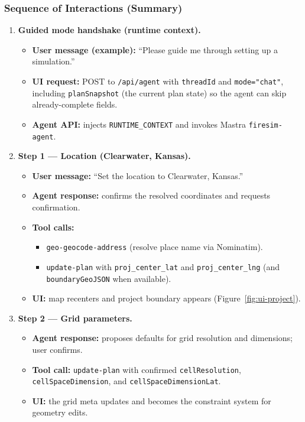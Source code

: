 \documentclass[12pt]{article}
\begin{document}
\subsubsection{Sequence of Interactions (Summary)}
\begin{enumerate}
  \item \textbf{Guided mode handshake (runtime context).}
  \begin{itemize}
    \item \textbf{User message (example):} ``Please guide me through setting up a simulation.''
    \item \textbf{UI request:} POST to \texttt{/api/agent} with \texttt{threadId} and
          \texttt{mode="chat"}, including \texttt{planSnapshot} (the current plan state) so the agent can
          skip already-complete fields.
    \item \textbf{Agent API:} injects \texttt{RUNTIME\_CONTEXT} and invokes Mastra
          \texttt{firesim-agent}.
  \end{itemize}

  \item \textbf{Step 1 --- Location (Clearwater, Kansas).}
  \begin{itemize}
    \item \textbf{User message:} ``Set the location to Clearwater, Kansas.''
    \item \textbf{Agent response:} confirms the resolved coordinates and requests confirmation.
    \item \textbf{Tool calls:}
      \begin{itemize}
        \item \texttt{geo-geocode-address} (resolve place name via Nominatim).
        \item \texttt{update-plan} with \texttt{proj\_center\_lat} and \texttt{proj\_center\_lng}
              (and \texttt{boundaryGeoJSON} when available).
      \end{itemize}
    \item \textbf{UI:} map recenters and project boundary appears (Figure~\ref{fig:ui-project}).
  \end{itemize}

  \item \textbf{Step 2 --- Grid parameters.}
  \begin{itemize}
    \item \textbf{Agent response:} proposes defaults for grid resolution and dimensions; user confirms.
    \item \textbf{Tool call:} \texttt{update-plan} with confirmed \texttt{cellResolution},
          \texttt{cellSpaceDimension}, and \texttt{cellSpaceDimensionLat}.
    \item \textbf{UI:} the grid meta updates and becomes the constraint system for geometry edits.
  \end{itemize}


\end{enumerate}
\end{document}
